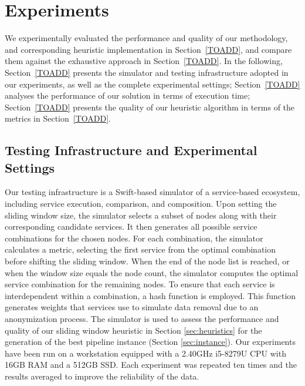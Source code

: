 \section{Experiments}\label{sec:experiment}

We experimentally evaluated the performance and quality of our methodology,
and corresponding heuristic implementation in Section~\ref{TOADD}, and compare them against the exhaustive approach in Section~\ref{TOADD}.
In the following, Section~\ref{TOADD} presents the simulator and testing infrastructure adopted in our experiments, as well as the complete experimental settings; Section~\ref{TOADD} analyses the performance of our solution in terms of execution time; Section~\ref{TOADD} presents the quality of our heuristic algorithm in terms of the metrics in Section~\ref{TOADD}.

\subsection{Testing Infrastructure and Experimental Settings}
Our testing infrastructure is a Swift-based simulator of a service-based ecosystem, including service execution, comparison, and composition.
Upon setting the sliding window size, the simulator selects a subset of nodes along with their corresponding candidate services.
It then generates all possible service combinations for the chosen nodes.
For each combination, the simulator calculates a metric, selecting the first service from the optimal combination before shifting the sliding window.
When the end of the node list is reached, or when the window size equals the node count, the simulator computes the optimal service combination for the remaining nodes.
To ensure that each service is interdependent within a combination, a hash function is employed. This function generates weights that services use to simulate data removal due to an anonymization process.
The simulator is used to assess the performance and quality of our sliding window heuristic in Section \ref{sec:heuristics} for the generation of the best pipeline instance (Section \ref{sec:instance}).
Our experiments have been run on a workstation equipped with a 2.40GHz i5-8279U CPU with 16GB RAM and a 512GB SSD.
Each experiment was repeated ten times and the results averaged to improve the reliability of the data.

